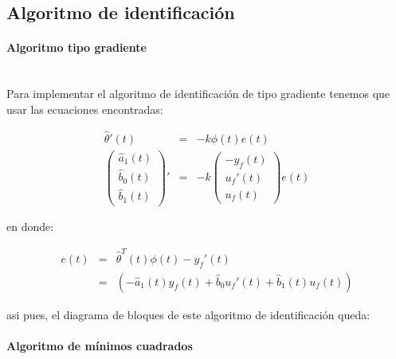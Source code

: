 
        \subsection{Algoritmo de identificación}

            \paragraph{Algoritmo tipo gradiente}\mbox{}\\

                Para implementar el algoritmo de identificación de tipo gradiente tenemos que usar las ecuaciones encontradas:

                \begin{eqnarray*}
                    \hat{\theta}'(t) & = & -k \phi(t) e(t) \\
                    \begin{pmatrix}
                        \hat{a}_1(t) \\
                        \hat{b}_0(t) \\
                        \hat{b}_1(t)
                    \end{pmatrix}' & = & -k
                    \begin{pmatrix}
                        -y_f(t) \\
                        u_f'(t) \\
                        u_f(t)
                    \end{pmatrix} e(t)
                \end{eqnarray*}

                en donde:

                \begin{eqnarray}
                    e(t) & = & \hat{\theta}^T(t) \phi(t) - y_f'(t) \\
                    & = & \left( -\hat{a}_1(t) y_f(t) + \hat{b}_0 u_f'(t) + \hat{b}_1(t) u_f(t) \right)
                \end{eqnarray}

                asi pues, el diagrama de bloques de este algoritmo de identificación queda:


            \paragraph{Algoritmo de mínimos cuadrados}\mbox{}\\

